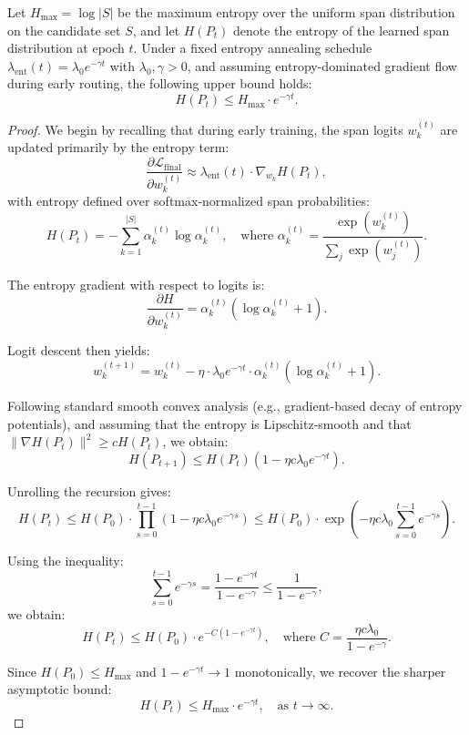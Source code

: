 \vspace{0.75em}
\begin{proposition}
\label{prop:routing_convergence}
Let \(H_{\max} = \log |S|\) be the maximum entropy over the uniform span distribution on the candidate set \(S\), and let \(H(P_t)\) denote the entropy of the learned span distribution at epoch \(t\). Under a fixed entropy annealing schedule \(\lambda_{\mathrm{ent}}(t) = \lambda_0 e^{-\gamma t}\) with \(\lambda_0, \gamma > 0\), and assuming entropy-dominated gradient flow during early routing, the following upper bound holds:
\[
H(P_t) \leq H_{\max} \cdot e^{-\gamma t}.
\]
\end{proposition}

\begin{proof}
We begin by recalling that during early training, the span logits \(w_k^{(t)}\) are updated primarily by the entropy term:
\[
\frac{\partial \mathcal{L}_{\text{final}}}{\partial w_k^{(t)}} \approx \lambda_{\mathrm{ent}}(t) \cdot \nabla_{w_k} H(P_t),
\]
with entropy defined over softmax-normalized span probabilities:
\[
H(P_t) = -\sum_{k=1}^{|S|} \alpha_k^{(t)} \log \alpha_k^{(t)}, \quad \text{where } \alpha_k^{(t)} = \frac{\exp(w_k^{(t)})}{\sum_j \exp(w_j^{(t)})}.
\]

The entropy gradient with respect to logits is:
\[
\frac{\partial H}{\partial w_k^{(t)}} = \alpha_k^{(t)} \left( \log \alpha_k^{(t)} + 1 \right).
\]

Logit descent then yields:
\[
w_k^{(t+1)} = w_k^{(t)} - \eta \cdot \lambda_0 e^{-\gamma t} \cdot \alpha_k^{(t)} (\log \alpha_k^{(t)} + 1).
\]

Following standard smooth convex analysis (e.g., gradient-based decay of entropy potentials), and assuming that the entropy is Lipschitz-smooth and that \(\|\nabla H(P_t)\|^2 \geq c H(P_t)\), we obtain:
\[
H(P_{t+1}) \leq H(P_t) \left(1 - \eta c \lambda_0 e^{-\gamma t}\right).
\]

Unrolling the recursion gives:
\[
H(P_t) \leq H(P_0) \cdot \prod_{s=0}^{t-1} \left(1 - \eta c \lambda_0 e^{-\gamma s}\right) \leq H(P_0) \cdot \exp\left(-\eta c \lambda_0 \sum_{s=0}^{t-1} e^{-\gamma s} \right).
\]

Using the inequality:
\[
\sum_{s=0}^{t-1} e^{-\gamma s} = \frac{1 - e^{-\gamma t}}{1 - e^{-\gamma}} \leq \frac{1}{1 - e^{-\gamma}},
\]
we obtain:
\[
H(P_t) \leq H(P_0) \cdot e^{-C (1 - e^{-\gamma t})}, \quad \text{where } C = \frac{\eta c \lambda_0}{1 - e^{-\gamma}}.
\]

Since \(H(P_0) \leq H_{\max}\) and \(1 - e^{-\gamma t} \to 1\) monotonically, we recover the sharper asymptotic bound:
\[
H(P_t) \leq H_{\max} \cdot e^{-\gamma t}, \quad \text{as } t \to \infty.
\]
\end{proof}

